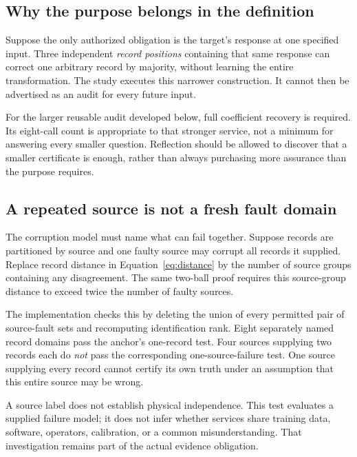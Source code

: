 \documentclass[11pt,letterpaper]{article}
\theoremstyle{remark}\newtheorem{remark}{Remark}[section]
\begin{document}
\subsection{Why the purpose belongs in the definition}
Suppose the only authorized obligation is the target's response at one specified input. Three independent \emph{record positions} containing that same response can correct one arbitrary record by majority, without learning the entire transformation. The study executes this narrower construction. It cannot then be advertised as an audit for every future input.

For the larger reusable audit developed below, full coefficient recovery is required. Its eight-call count is appropriate to that stronger service, not a minimum for answering every smaller question. Reflection should be allowed to discover that a smaller certificate is enough, rather than always purchasing more assurance than the purpose requires.

\subsection{A repeated source is not a fresh fault domain}
The corruption model must name what can fail together. Suppose records are partitioned by source and one faulty source may corrupt all records it supplied. Replace record distance in Equation~\eqref{eq:distance} by the number of source groups containing any disagreement. The same two-ball proof requires this source-group distance to exceed twice the number of faulty sources.

The implementation checks this by deleting the union of every permitted pair of source-fault sets and recomputing identification rank. Eight separately named record domains pass the anchor's one-record test. Four sources supplying two records each do \emph{not} pass the corresponding one-source-failure test. One source supplying every record cannot certify its own truth under an assumption that this entire source may be wrong.

A source label does not establish physical independence. This test evaluates a supplied failure model; it does not infer whether services share training data, software, operators, calibration, or a common misunderstanding. That investigation remains part of the actual evidence obligation.
\end{document}
